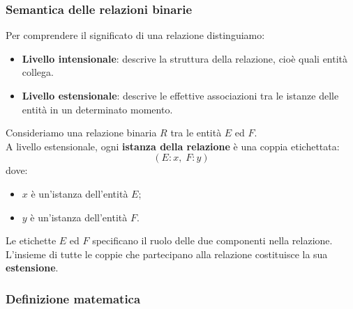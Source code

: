 \subsubsection{Semantica delle relazioni binarie}

Per comprendere il significato di una relazione
distinguiamo:
\begin{itemize}
    \item \textbf{Livello intensionale}: descrive
    la struttura della relazione, cioè quali
    entità collega.
    \item \textbf{Livello estensionale}: descrive
    le effettive associazioni tra le istanze
    delle entità in un determinato momento.
\end{itemize}
\noindent
Consideriamo una relazione binaria $R$
tra le entità $E$ ed $F$.\\
A livello estensionale, ogni \textbf{istanza
della relazione} è una coppia etichettata:
\[
(E:x,\;F:y)
\]
dove:
\begin{itemize}
    \item $x$ è un'istanza dell'entità $E$;
    \item $y$ è un'istanza dell'entità $F$.
\end{itemize}
\noindent
Le etichette $E$ ed $F$ specificano
il ruolo delle due componenti nella relazione.\\
L'insieme di tutte le coppie che partecipano
alla relazione costituisce la sua
\textbf{estensione}.

\subsubsection{Definizione matematica}

